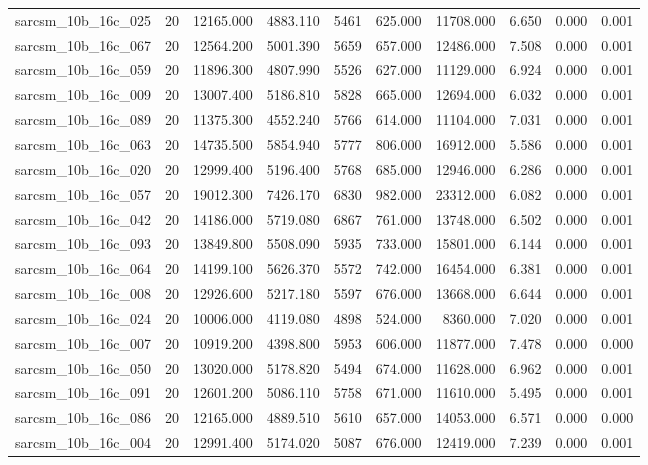 \begin{tabular}{lrrrrrrrrr}
sarcsm\_10b\_16c\_025 & 20 & 12165.000 & 4883.110 & 5461 & 625.000 & 11708.000 & 6.650 & 0.000 & 0.001 \\
sarcsm\_10b\_16c\_067 & 20 & 12564.200 & 5001.390 & 5659 & 657.000 & 12486.000 & 7.508 & 0.000 & 0.001 \\
sarcsm\_10b\_16c\_059 & 20 & 11896.300 & 4807.990 & 5526 & 627.000 & 11129.000 & 6.924 & 0.000 & 0.001 \\
sarcsm\_10b\_16c\_009 & 20 & 13007.400 & 5186.810 & 5828 & 665.000 & 12694.000 & 6.032 & 0.000 & 0.001 \\
sarcsm\_10b\_16c\_089 & 20 & 11375.300 & 4552.240 & 5766 & 614.000 & 11104.000 & 7.031 & 0.000 & 0.001 \\
sarcsm\_10b\_16c\_063 & 20 & 14735.500 & 5854.940 & 5777 & 806.000 & 16912.000 & 5.586 & 0.000 & 0.001 \\
sarcsm\_10b\_16c\_020 & 20 & 12999.400 & 5196.400 & 5768 & 685.000 & 12946.000 & 6.286 & 0.000 & 0.001 \\
sarcsm\_10b\_16c\_057 & 20 & 19012.300 & 7426.170 & 6830 & 982.000 & 23312.000 & 6.082 & 0.000 & 0.001 \\
sarcsm\_10b\_16c\_042 & 20 & 14186.000 & 5719.080 & 6867 & 761.000 & 13748.000 & 6.502 & 0.000 & 0.001 \\
sarcsm\_10b\_16c\_093 & 20 & 13849.800 & 5508.090 & 5935 & 733.000 & 15801.000 & 6.144 & 0.000 & 0.001 \\
sarcsm\_10b\_16c\_064 & 20 & 14199.100 & 5626.370 & 5572 & 742.000 & 16454.000 & 6.381 & 0.000 & 0.001 \\
sarcsm\_10b\_16c\_008 & 20 & 12926.600 & 5217.180 & 5597 & 676.000 & 13668.000 & 6.644 & 0.000 & 0.001 \\
sarcsm\_10b\_16c\_024 & 20 & 10006.000 & 4119.080 & 4898 & 524.000 & 8360.000 & 7.020 & 0.000 & 0.001 \\
sarcsm\_10b\_16c\_007 & 20 & 10919.200 & 4398.800 & 5953 & 606.000 & 11877.000 & 7.478 & 0.000 & 0.000 \\
sarcsm\_10b\_16c\_050 & 20 & 13020.000 & 5178.820 & 5494 & 674.000 & 11628.000 & 6.962 & 0.000 & 0.001 \\
sarcsm\_10b\_16c\_091 & 20 & 12601.200 & 5086.110 & 5758 & 671.000 & 11610.000 & 5.495 & 0.000 & 0.001 \\
sarcsm\_10b\_16c\_086 & 20 & 12165.000 & 4889.510 & 5610 & 657.000 & 14053.000 & 6.571 & 0.000 & 0.000 \\
sarcsm\_10b\_16c\_004 & 20 & 12991.400 & 5174.020 & 5087 & 676.000 & 12419.000 & 7.239 & 0.000 & 0.001 \\

\end{tabular}
